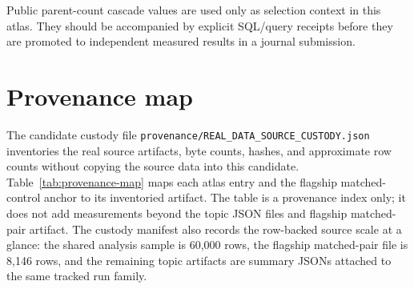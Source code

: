 \documentclass[twocolumn]{aastex631}
\begin{document}
Public parent-count cascade values are used only as selection context in this atlas. They should be accompanied by explicit SQL/query receipts before they are promoted to independent measured results in a journal submission.

\section{Provenance map}
The candidate custody file \texttt{provenance/REAL\_DATA\_SOURCE\_CUSTODY.json} inventories the real source artifacts, byte counts, hashes, and approximate row counts without copying the source data into this candidate. Table~\ref{tab:provenance-map} maps each atlas entry and the flagship matched-control anchor to its inventoried artifact. The table is a provenance index only; it does not add measurements beyond the topic JSON files and flagship matched-pair artifact.
The custody manifest also records the row-backed source scale at a glance: the shared analysis sample is 60,000 rows, the flagship matched-pair file is 8,146 rows, and the remaining topic artifacts are summary JSONs attached to the same tracked run family.
\end{document}
